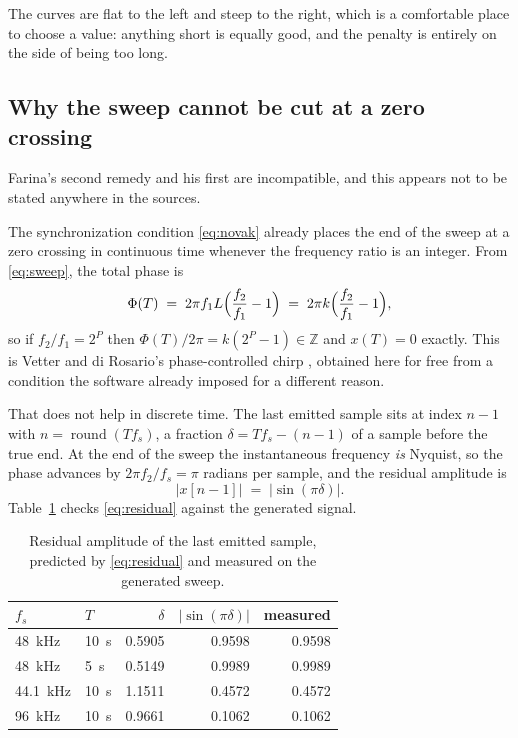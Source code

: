 \documentclass[11pt,a4paper]{article}
\begin{document}
The curves are flat to the left and steep to the right, which is a comfortable
place to choose a value: anything short is equally good, and the penalty is
entirely on the side of being too long.

\subsection{Why the sweep cannot be cut at a zero crossing}
\label{sec:nyquist-end}

Farina's second remedy and his first are incompatible, and this appears not to
be stated anywhere in the sources.

The synchronization condition \eqref{eq:novak} already places the end of the
sweep at a zero crossing in continuous time whenever the frequency ratio is an
integer. From \eqref{eq:sweep}, the total phase is
%
\begin{equation}
  \Phi(T) \;=\; 2\pi f_1 L \Bigl( \frac{f_2}{f_1} - 1 \Bigr)
            \;=\; 2\pi k \Bigl( \frac{f_2}{f_1} - 1 \Bigr),
  \label{eq:endphase}
\end{equation}
%
so if $f_2/f_1 = 2^P$ then $\Phi(T)/2\pi = k(2^P - 1) \in \mathbb{Z}$ and
$x(T) = 0$ exactly. This is Vetter and di Rosario's phase-controlled chirp
\cite{Vetter2011}, obtained here for free from a condition the software already
imposed for a different reason.

That does not help in discrete time. The last emitted sample sits at index
$n-1$ with $n = \operatorname{round}(T f_s)$, a fraction
$\delta = T f_s - (n-1)$ of a sample before the true end. At the end of the
sweep the instantaneous frequency \emph{is} Nyquist, so the phase advances by
$2\pi f_2/f_s = \pi$ radians per sample, and the residual amplitude is
%
\begin{equation}
  \bigl| x[n-1] \bigr| \;=\; \bigl| \sin (\pi \delta) \bigr|.
  \label{eq:residual}
\end{equation}
%
Table~\ref{tab:residual} checks \eqref{eq:residual} against the generated
signal.

\begin{table}[h]
\centering
\caption{Residual amplitude of the last emitted sample, predicted by
\eqref{eq:residual} and measured on the generated sweep.}
\label{tab:residual}
\begin{tabular}{llrrr}
\toprule
$f_s$ & $T$ & $\delta$ & $|\sin(\pi\delta)|$ & measured \\
\midrule
\SI{48}{\kilo\hertz}   & \SI{10}{\second} & 0.5905 & 0.9598 & 0.9598 \\
\SI{48}{\kilo\hertz}   & \SI{5}{\second}  & 0.5149 & 0.9989 & 0.9989 \\
\SI{44.1}{\kilo\hertz} & \SI{10}{\second} & 1.1511 & 0.4572 & 0.4572 \\
\SI{96}{\kilo\hertz}   & \SI{10}{\second} & 0.9661 & 0.1062 & 0.1062 \\
\bottomrule
\end{tabular}
\end{table}
\end{document}
